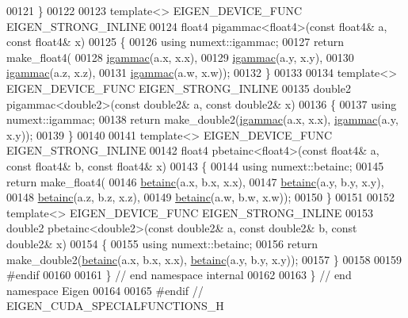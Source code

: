 \begin{DoxyCode}
00121 \}
00122 
00123 \textcolor{keyword}{template}<> EIGEN\_DEVICE\_FUNC EIGEN\_STRONG\_INLINE
00124 float4 pigammac<float4>(\textcolor{keyword}{const} float4& a, \textcolor{keyword}{const} float4& x)
00125 \{
00126   \textcolor{keyword}{using} numext::igammac;
00127   \textcolor{keywordflow}{return} make\_float4(
00128       \hyperlink{namespace_eigen_a1abaa2ff8c7b1871eaf026a47c6bbf3b}{igammac}(a.x, x.x),
00129       \hyperlink{namespace_eigen_a1abaa2ff8c7b1871eaf026a47c6bbf3b}{igammac}(a.y, x.y),
00130       \hyperlink{namespace_eigen_a1abaa2ff8c7b1871eaf026a47c6bbf3b}{igammac}(a.z, x.z),
00131       \hyperlink{namespace_eigen_a1abaa2ff8c7b1871eaf026a47c6bbf3b}{igammac}(a.w, x.w));
00132 \}
00133 
00134 \textcolor{keyword}{template}<> EIGEN\_DEVICE\_FUNC EIGEN\_STRONG\_INLINE
00135 double2 pigammac<double2>(\textcolor{keyword}{const} double2& a, \textcolor{keyword}{const} double2& x)
00136 \{
00137   \textcolor{keyword}{using} numext::igammac;
00138   \textcolor{keywordflow}{return} make\_double2(\hyperlink{namespace_eigen_a1abaa2ff8c7b1871eaf026a47c6bbf3b}{igammac}(a.x, x.x), \hyperlink{namespace_eigen_a1abaa2ff8c7b1871eaf026a47c6bbf3b}{igammac}(a.y, x.y));
00139 \}
00140 
00141 \textcolor{keyword}{template}<> EIGEN\_DEVICE\_FUNC EIGEN\_STRONG\_INLINE
00142 float4 pbetainc<float4>(\textcolor{keyword}{const} float4& a, \textcolor{keyword}{const} float4& b, \textcolor{keyword}{const} float4& x)
00143 \{
00144   \textcolor{keyword}{using} numext::betainc;
00145   \textcolor{keywordflow}{return} make\_float4(
00146       \hyperlink{namespace_eigen_a726eae91d4e91d8e25cbe55fffa6a92f}{betainc}(a.x, b.x, x.x),
00147       \hyperlink{namespace_eigen_a726eae91d4e91d8e25cbe55fffa6a92f}{betainc}(a.y, b.y, x.y),
00148       \hyperlink{namespace_eigen_a726eae91d4e91d8e25cbe55fffa6a92f}{betainc}(a.z, b.z, x.z),
00149       \hyperlink{namespace_eigen_a726eae91d4e91d8e25cbe55fffa6a92f}{betainc}(a.w, b.w, x.w));
00150 \}
00151 
00152 \textcolor{keyword}{template}<> EIGEN\_DEVICE\_FUNC EIGEN\_STRONG\_INLINE
00153 double2 pbetainc<double2>(\textcolor{keyword}{const} double2& a, \textcolor{keyword}{const} double2& b, \textcolor{keyword}{const} double2& x)
00154 \{
00155   \textcolor{keyword}{using} numext::betainc;
00156   \textcolor{keywordflow}{return} make\_double2(\hyperlink{namespace_eigen_a726eae91d4e91d8e25cbe55fffa6a92f}{betainc}(a.x, b.x, x.x), \hyperlink{namespace_eigen_a726eae91d4e91d8e25cbe55fffa6a92f}{betainc}(a.y, b.y, x.y));
00157 \}
00158 
00159 \textcolor{preprocessor}{#endif}
00160 
00161 \} \textcolor{comment}{// end namespace internal}
00162 
00163 \} \textcolor{comment}{// end namespace Eigen}
00164 
00165 \textcolor{preprocessor}{#endif // EIGEN\_CUDA\_SPECIALFUNCTIONS\_H}
\end{DoxyCode}
